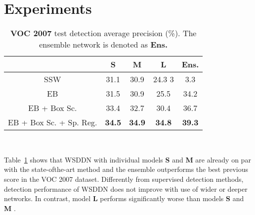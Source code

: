 \documentclass[10pt,twocolumn,letterpaper]{article}
\begin{document}
\section{Experiments}
\begin{table}[htbp]
\small
\begin{tabular}{|c|cccc|}
\hline
  & \textbf{S} & \textbf{M} & \textbf{L} & \textbf{Ens.} \\
\hline
\hline
SSW & 31.1 & 30.9 & 24.3 3& 3.3 \\
EB & 31.5 & 30.9 & 25.5 & 34.2 \\
EB + Box Sc. & 33.4 & 32.7 & 30.4 & 36.7 \\
EB + Box Sc. + Sp. Reg. & \textbf{34.5} & \textbf{34.9} & \textbf{34.8} & \textbf{39.3} \\
\hline
\end{tabular} \\
\caption{\textbf{VOC 2007} test detection average precision (\%). The ensemble network is denoted as \textbf{Ens.}}
\label{tab1}
\end{table}
Table~\ref{tab1} shows that WSDDN with individual models \textbf{S} and \textbf{M} are already on par with the state-ofthe-art method and the ensemble outperforms the best previous score in the VOC 2007 dataset. Differently from supervised detection methods, detection performance of WSDDN does not improve with use of wider or deeper networks. In contrast, model \textbf{L} performs significantly worse than models \textbf{S} and \textbf{M} \cite{Hariharan2014Simultaneous}.
{\small


}
\end{document}
